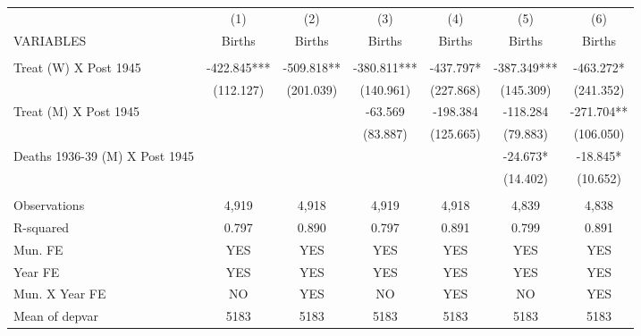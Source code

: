 \begin{tabular}{lcccccc} \hline
 & (1) & (2) & (3) & (4) & (5) & (6) \\
VARIABLES & Births & Births & Births & Births & Births & Births \\ \hline
 &  &  &  &  &  &  \\
Treat (W) X Post 1945 & -422.845*** & -509.818** & -380.811*** & -437.797* & -387.349*** & -463.272* \\
 & (112.127) & (201.039) & (140.961) & (227.868) & (145.309) & (241.352) \\
Treat (M) X Post 1945 &  &  & -63.569 & -198.384 & -118.284 & -271.704** \\
 &  &  & (83.887) & (125.665) & (79.883) & (106.050) \\
Deaths 1936-39 (M) X Post 1945 &  &  &  &  & -24.673* & -18.845* \\
 &  &  &  &  & (14.402) & (10.652) \\
 &  &  &  &  &  &  \\
Observations & 4,919 & 4,918 & 4,919 & 4,918 & 4,839 & 4,838 \\
R-squared & 0.797 & 0.890 & 0.797 & 0.891 & 0.799 & 0.891 \\
Mun. FE & YES & YES & YES & YES & YES & YES \\
Year FE & YES & YES & YES & YES & YES & YES \\
Mun. X Year FE & NO & YES & NO & YES & NO & YES \\
 Mean of depvar & 5183 & 5183 & 5183 & 5183 & 5183 & 5183 \\ \hline
\end{tabular}
